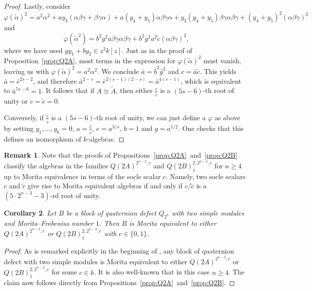 \documentclass{amsart}
\theoremstyle{plain}\newtheorem{Theorem}{Theorem}[section]
\theoremstyle{plain}\newtheorem{Conjecture}[Theorem]{Conjecture}
\theoremstyle{plain}\newtheorem{Corollary}[Theorem]{Corollary}
\theoremstyle{plain}\newtheorem{Lemma}[Theorem]{Lemma}
\theoremstyle{plain}\newtheorem{Proposition}[Theorem]{Proposition}
\theoremstyle{definition}\newtheorem{Definition}[Theorem]{Definition}
\theoremstyle{definition}\newtheorem{Example}[Theorem]{Example}
\theoremstyle{definition}\newtheorem{Examples}[Theorem]{Examples}
\theoremstyle{definition}\newtheorem{Exercise}[Theorem]{Exercise}
\theoremstyle{definition}\newtheorem{Notation}[Theorem]{Notation}
\theoremstyle{definition}\newtheorem{Remark}[Theorem]{Remark}
\theoremstyle{definition}\newtheorem{Remarks}[Theorem]{Remarks}
\numberwithin{equation}{section}
\begin{document}
\begin{proof}
      Lastly, consider 
      $$
        \varphi(\tilde \alpha)^2 = a^2 \alpha^2 + ay_3(\alpha\beta\gamma+\beta\gamma\alpha)+a(y_4+y_5)\alpha\beta\gamma\alpha + y_3(y_4+y_5)\beta\gamma\alpha\beta\gamma + (y_4+y_5)^2(\alpha\beta\gamma)^2
      $$
      and 
      $$
        \varphi(\tilde\alpha^2)= b^2g^2a \beta\gamma\alpha\beta\gamma + b^2g^2a^2 \tilde c(\alpha\beta\gamma)^2,
      $$
      where we have used $gy_1+by_2\in z^2k[z]$. Just as in the proof of Proposition~\ref{prop:Q2A}, most terms in the expression for $\varphi(\tilde \alpha)^2$ must vanish, leaving us with $\varphi(\tilde \alpha)^2 = a^2 \alpha^2$.
      We conclude $\bar a=\bar b^2\bar g^2$ and $c=\bar a \tilde c$. This yields $\bar a=\bar e^{2s-2}$, and therefore $\bar a^{2-s}=\bar e^{2(s-1)(2-s)}=\bar a^{4(s-1)}$, which is equivalent to $\bar a^{5s-6}=1$. It follows that  if $A\cong\tilde A$, then either $\frac{c}{\tilde c}$ is a $(5s-6)$-th root of unity or $c=\tilde c=0$. 

      Conversely, if  $\frac{c}{\tilde c}$ is a $(5s-6)$-th root of unity, we can just define a $\varphi$ as above by setting $y_1,\ldots,y_6=0$, $a=\frac{c}{\tilde c}$, $e=a^{3/s}$, $b=1$ and $g=a^{1/2}$. One checks that this defines an isomorphism of $k$-algebras.
\end{proof}

\begin{Remark}
  Note that the proofs of Propositions~\ref{prop:Q2A}~and~\ref{prop:Q2B} classify the algebras in the families $Q(2A)^{2^{n-2},c}$ and $Q(2B)_1^{2,2^{n-2},c}$ for $n\geq 4$ up to Morita equivalence in terms of the socle scalar $c$. Namely, two socle scalars $c$ and $\tilde c$ give rise to Morita equivalent algebras if and only if $c/\tilde c$ is a $(5\cdot 2^{n-3}-3)$-rd root of unity.
\end{Remark}  

\begin{Corollary} \label{scalar}
    Let $B$ be a block of quaternion defect $Q_{2^n}$ with two simple modules and Morita--Frobenius number $1$. Then $B$ is Morita equivalent to either $Q(2A)^{2^{n-2},c}$ or $Q(2B)_1^{2,2^{n-2},c}$ with $c\in\{0,1\}$.
\end{Corollary}
\begin{proof}
    As is remarked explicitly in the beginning of \cite[Sec.~4.1]{Holm97}, any block of quaternion defect with two simple modules is Morita equivalent to either $Q(2A)^{2^{n-2},c}$ or $Q(2B)_1^{2,2^{n-2},c}$ for some $c\in k$. It is also well-known that in this case $n\geq 4$. The claim now follows directly from Propositions~\ref{prop:Q2A}~and~\ref{prop:Q2B}.
\end{proof}
\end{document}
